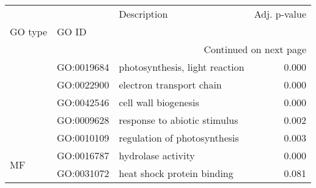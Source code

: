 \begin{longtable}{lllr}
\toprule
   &            &                     Description &  Adj. p-value \\
GO type & GO ID &                                 &               \\
\midrule
\endhead
\midrule
\multicolumn{4}{r}{{Continued on next page}} \\
\midrule
\endfoot

\bottomrule
\endlastfoot
\multirow{5}{*}{BP} & GO:0019684 &  photosynthesis, light reaction &         0.000 \\
   & GO:0022900 &        electron transport chain &         0.000 \\
   & GO:0042546 &            cell wall biogenesis &         0.000 \\
   & GO:0009628 &    response to abiotic stimulus &         0.002 \\
   & GO:0010109 &    regulation of photosynthesis &         0.003 \\
\cline{1-4}
\multirow{2}{*}{MF} & GO:0016787 &              hydrolase activity &         0.000 \\
   & GO:0031072 &      heat shock protein binding &         0.081 \\
\end{longtable}

